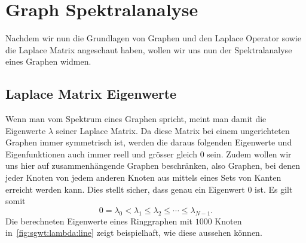
\section{Graph Spektralanalyse\label{sec:sgwt:spectralanalysis}}

Nachdem wir nun die Grundlagen von Graphen und den Laplace Operator sowie die 
Laplace Matrix angeschaut haben, wollen wir uns nun der Spektralanalyse eines 
Graphen widmen.

\subsection{Laplace Matrix Eigenwerte}

Wenn man vom Spektrum eines Graphen spricht, meint man damit die Eigenwerte 
$\lambda$ seiner Laplace Matrix. Da diese Matrix bei einem ungerichteten 
Graphen immer symmetrisch ist, werden die daraus folgenden Eigenwerte und 
Eigenfunktionen auch immer reell und gr\"osser gleich $0$ sein. Zudem wollen wir 
uns hier auf zusammenh\"angende Graphen beschr\"anken, also Graphen, bei denen jeder 
Knoten von jedem anderen Knoten aus mittels eines Sets von Kanten erreicht 
werden kann. Dies stellt sicher, dass genau ein Eigenwert $0$ 
ist. Es gilt somit
\begin{equation}
0 = \lambda_0 < \lambda_1 \leq \lambda_2 \leq \cdots \leq \lambda_{N-1}.
\label{eq:sgwt:lambda:series}
\end{equation}
Die berechneten Eigenwerte eines Ringgraphen mit $1000$ Knoten 
in~\cref{fig:sgwt:lambda:line} zeigt beispielhaft, wie diese aussehen k\"onnen.
